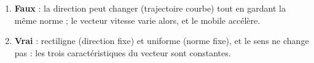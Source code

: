 \documentclass[11pt,a4paper]{article}
\begin{document}
\begin{corrige}
\begin{enumerate}[label=\alph*)]
  \item \textbf{Faux} : la direction peut changer (trajectoire courbe) tout en gardant la même norme ; le vecteur vitesse varie alors, et le mobile accélère.
  \item \textbf{Vrai} : rectiligne (direction fixe) et uniforme (norme fixe), et le sens ne change pas : les trois caractéristiques du vecteur sont constantes.
\end{enumerate}
\end{corrige}
\end{document}
